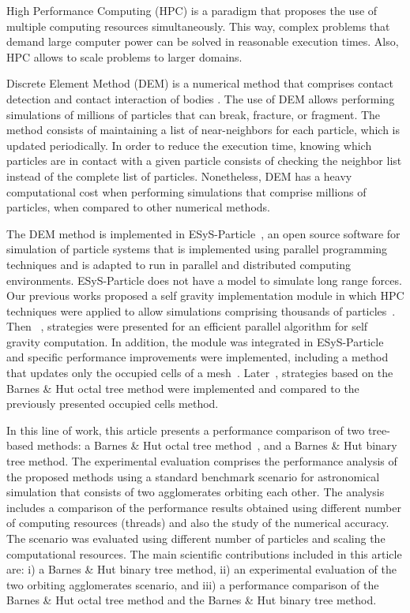 \documentclass[runningheads]{llncs}
\begin{document}
High Performance Computing (HPC) is a paradigm that proposes the use of multiple computing resources simultaneously. This way, complex problems that demand large computer power can be solved in reasonable execution times. Also, HPC allows to scale problems to larger domains. 

Discrete Element Method (DEM) is a numerical method that comprises contact detection and contact interaction of bodies \cite{cundall1979discrete}. The use of DEM allows performing simulations of millions of particles that can break, fracture, or fragment. The method consists of maintaining a list of near-neighbors for each particle, which is updated periodically. In order to reduce the execution time, knowing which particles are in contact with a given particle consists of checking the neighbor list instead of the complete list of particles. Nonetheless, DEM has a heavy computational cost when performing simulations that comprise millions of particles, when compared to other numerical methods. 

The DEM method is implemented in ESyS-Particle~\cite{abe2009esys}, an open source software for simulation of particle systems that is implemented using parallel programming techniques and is adapted to run in parallel and distributed computing environments. ESyS-Particle does not have a model to simulate long range forces. Our previous works proposed a self gravity implementation module in which HPC techniques were applied to allow simulations comprising thousands of particles~\cite{frascarelli2014high}. Then ~\cite{nesmachnow2015parallel}, strategies were presented for an efficient parallel algorithm for self gravity computation. In addition, the module was integrated in ESyS-Particle and specific performance improvements were implemented, including a method that updates only the occupied cells of a mesh~\cite{rocchetti2017performance}. Later~\cite{rocchetti2018}, strategies based on the Barnes \& Hut octal tree method were implemented and compared to the previously presented occupied cells method.

In this line of work, this article presents a performance comparison of two tree-based methods: a Barnes \& Hut octal tree method~\cite{rocchetti2018}, and a Barnes \& Hut binary tree method. The experimental evaluation comprises the performance analysis of the proposed methods using a standard benchmark scenario for astronomical simulation that consists of two agglomerates orbiting each other. The analysis includes a comparison of the performance results obtained using different number of computing resources (threads) and also the study of the numerical accuracy. The scenario was evaluated using different number of particles and scaling the computational resources. The main scientific contributions included in this article are: i) a Barnes \& Hut binary tree method, ii) an experimental evaluation of the two orbiting agglomerates scenario, and iii) a performance comparison of the Barnes \& Hut octal tree method and the Barnes \& Hut binary tree method.
\end{document}
